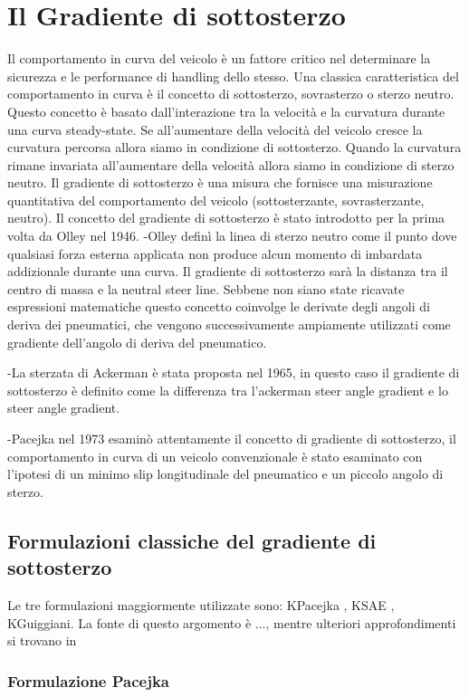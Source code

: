 \chapter{Il Gradiente di sottosterzo}
\label{cha:cap2}
Il comportamento in curva del veicolo è un fattore critico nel determinare la
sicurezza e le performance di handling dello stesso.
Una classica caratteristica del comportamento in curva è il concetto di
sottosterzo, sovrasterzo o sterzo neutro. Questo concetto è basato dall’interazione 
tra la velocità e la curvatura durante una curva steady-state.
Se all’aumentare della velocità del veicolo cresce la curvatura percorsa allora 
siamo in condizione di sottosterzo.
Quando la curvatura rimane invariata all’aumentare della velocità allora siamo in
condizione di sterzo neutro.
Il gradiente di sottosterzo è una misura che fornisce una misurazione quantitativa 
del comportamento del veicolo (sottosterzante, sovrasterzante, neutro).
Il concetto del gradiente di sottosterzo è stato introdotto per la prima volta da 
Olley nel 1946.
-Olley definì la linea di sterzo neutro come il punto dove qualsiasi forza esterna applicata non produce alcun momento di imbardata addizionale durante una curva. Il gradiente di sottosterzo sarà la distanza tra il centro di massa e la neutral steer line.
Sebbene non siano state ricavate espressioni matematiche questo concetto coinvolge le derivate degli angoli di deriva dei pneumatici, che vengono successivamente ampiamente utilizzati come gradiente dell’angolo di deriva del pneumatico.

-La sterzata di Ackerman è stata proposta nel 1965, in questo caso il gradiente di sottosterzo è definito come la differenza tra l’ackerman steer angle gradient e lo steer angle gradient.

-Pacejka nel 1973 esaminò attentamente il concetto di gradiente di sottosterzo, il comportamento in curva di un veicolo convenzionale è stato esaminato con l’ipotesi di un minimo slip longitudinale del pneumatico e un piccolo angolo di sterzo.



\section{Formulazioni classiche del gradiente di sottosterzo}
Le tre formulazioni maggiormente utilizzate sono:  KPacejka , KSAE , KGuiggiani.
La fonte di questo argomento è ..., mentre ulteriori approfondimenti si trovano in 
\subsection{Formulazione Pacejka}

